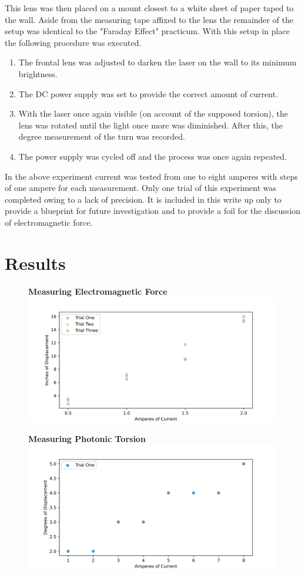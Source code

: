 \documentclass{article}
\begin{document}
This lens was then placed on a mount closest to a white sheet of paper taped to the wall. Aside from the measuring tape affixed to the lens the remainder of the setup was identical to the "Faraday Effect" practicum. With this setup in place the following procedure was executed.
\begin{enumerate}
    \item The frontal lens was adjusted to darken the laser on the wall to its minimum brightness. 
    \item The DC power supply was set to provide the correct amount of current. 
    \item With the laser once again visible (on account of the supposed torsion), the lens was rotated until the light once more was diminished. After this, the degree measurement of the turn was recorded. 
    \item The power supply was cycled off and the process was once again repeated. 
\end{enumerate}
In the above experiment current was tested from one to eight amperes with steps of one ampere for each measurement. Only one trial of this experiment was completed owing to a lack of precision. It is included in this write up only to provide a blueprint for future investigation and to provide a foil for the discussion of electromagnetic force. 
\newpage
\section[t]{Results}

\begin{figure}[h]
\centering\textbf{Measuring Electromagnetic Force}
    \includegraphics[width=.75\linewidth]{amps_vs_dispv0.png}
\end{figure}


\begin{figure}[h]
    \centering\textbf{Measuring Photonic Torsion}
    \includegraphics[width=0.75\linewidth]{amps_vs_degrees.png}

\end{figure}
\end{document}
